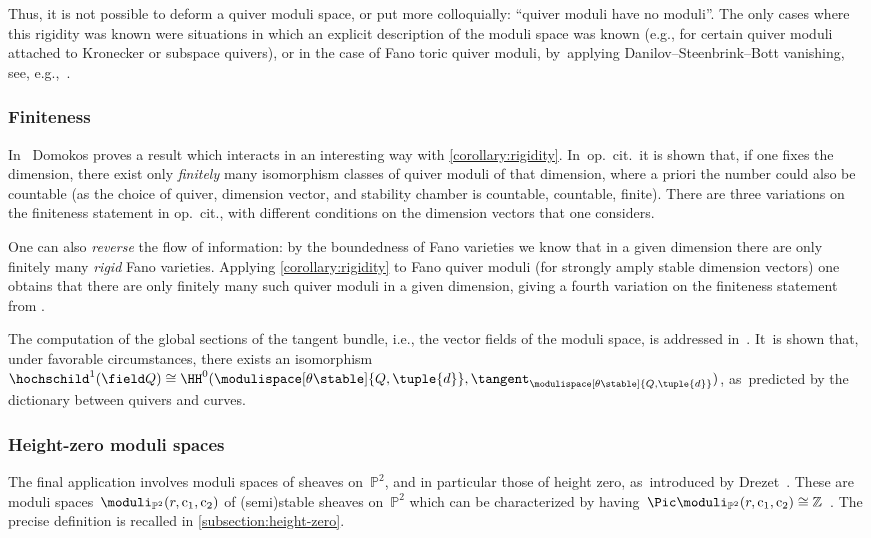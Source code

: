 Thus, it is not possible to deform a quiver moduli space,
or put more colloquially: ``quiver moduli have no moduli''.
The only cases where this rigidity was known
were situations in which an explicit description of the moduli space was known
(e.g., for certain quiver moduli attached to Kronecker or subspace quivers),
or in the case of Fano toric quiver moduli, by~applying Danilov–Steenbrink–Bott vanishing,
see, e.g.,~\cite[Th.\,2.4(i)]{MR1916637}.

\subsubsection*{Finiteness}
In~\cite{2303.08522v2} Domokos proves a result which interacts
in an interesting way with \cref{corollary:rigidity}. In~op.~cit.~it is shown that,
if one fixes the dimension,
there exist only \emph{finitely} many isomorphism classes of quiver moduli of that dimension,
where a priori the number could also be countable
(as the choice of quiver, dimension vector, and stability chamber is
countable, \resp countable, \resp finite).
There are three variations on the finiteness statement in op.~cit.,
with different conditions on the dimension vectors that one considers.

One can also \emph{reverse} the flow of information:
by the boundedness of Fano varieties \cite[Th.\,0.2]{MR1189503}
we know that in a given dimension there are only finitely many \emph{rigid} Fano varieties.
Applying \cref{corollary:rigidity} to Fano quiver moduli (for strongly amply stable dimension vectors)
one obtains that there are only finitely many such quiver moduli in a given dimension,
giving a fourth variation on the finiteness statement from \cite{2303.08522v2}.

\smallskip

The computation of the global sections of the tangent bundle,
i.e., the vector fields of the moduli space,
is addressed in~\cite{MR4883104}. It~is shown that,
under favorable circumstances,
there exists an isomorphism~$\hochschild^1(\field Q)\cong\HH^0(\modulispace[\theta\stable]{Q,\tuple{d}},\tangent_{\modulispace[\theta\stable]{Q,\tuple{d}}})$, as~predicted by the dictionary between quivers and curves.

\subsubsection*{Height-zero moduli spaces}
The final application involves moduli spaces of sheaves on~$\mathbb{P}^2$,
and in particular those of height zero, as~introduced by Drezet~\cite{MR0916199,MR0944602,MR0915184}.
These are moduli spaces~$\moduli_{\mathbb{P}^2}(r,\mathrm{c}_1,\mathrm{c}_2)$
of (semi)stable sheaves on~$\mathbb{P}^2$
which can be characterized by having~$\Pic\moduli_{\mathbb{P}^2}(r,\mathrm{c}_1,\mathrm{c}_2)\cong\mathbb{Z}$~\cite[Th.\,2]{MR0915184}.
The precise definition is recalled in \cref{subsection:height-zero}.

